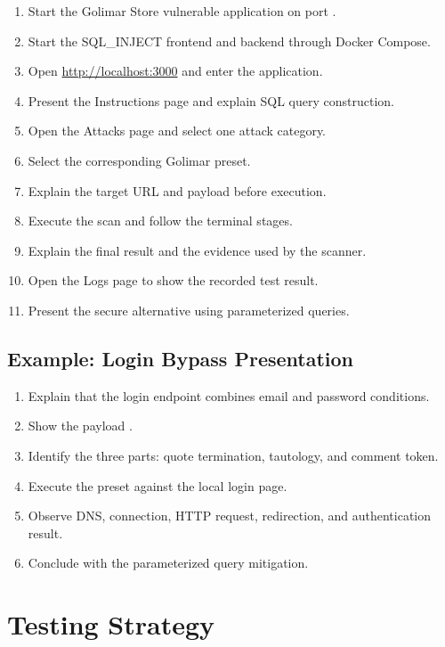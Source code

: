 \documentclass[12pt,a4paper]{article}
\newcommand{\code}[1]{\texttt{\detokenize{#1}}}
\newcommand{\projectname}{SQL\_INJECT}
\begin{document}
\begin{enumerate}[leftmargin=1.4cm]
    \item Start the Golimar Store vulnerable application on port \code{2000}.
    \item Start the \projectname{} frontend and backend through Docker Compose.
    \item Open \url{http://localhost:3000} and enter the application.
    \item Present the Instructions page and explain SQL query construction.
    \item Open the Attacks page and select one attack category.
    \item Select the corresponding Golimar preset.
    \item Explain the target URL and payload before execution.
    \item Execute the scan and follow the terminal stages.
    \item Explain the final result and the evidence used by the scanner.
    \item Open the Logs page to show the recorded test result.
    \item Present the secure alternative using parameterized queries.
\end{enumerate}

\subsection{Example: Login Bypass Presentation}

\begin{enumerate}[leftmargin=1.4cm]
    \item Explain that the login endpoint combines email and password conditions.
    \item Show the payload \code{admin ' OR 1=1 --}.
    \item Identify the three parts: quote termination, tautology, and comment token.
    \item Execute the preset against the local login page.
    \item Observe DNS, connection, HTTP request, redirection, and authentication result.
    \item Conclude with the parameterized query mitigation.
\end{enumerate}

\section{Testing Strategy}
\end{document}

